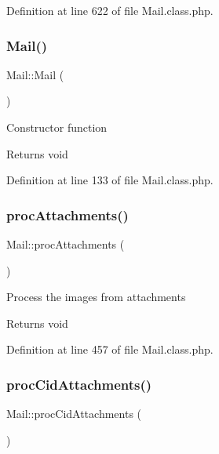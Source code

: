 Definition at line 622 of file Mail.\+class.\+php.

\hypertarget{classMail_acd3d916cd6a769cdaf6e91dbc2c85699}{}\label{classMail_acd3d916cd6a769cdaf6e91dbc2c85699} 
\subsubsection{\texorpdfstring{Mail()}{Mail()}}
{\footnotesize\ttfamily Mail\+::\+Mail (\begin{DoxyParamCaption}{ }\end{DoxyParamCaption})}

Constructor function

\begin{DoxyReturn}{Returns}
void 
\end{DoxyReturn}


Definition at line 133 of file Mail.\+class.\+php.

\hypertarget{classMail_a136e94d3b4ae6cea8944cf05f58754ce}{}\label{classMail_a136e94d3b4ae6cea8944cf05f58754ce} 
\subsubsection{\texorpdfstring{proc\+Attachments()}{procAttachments()}}
{\footnotesize\ttfamily Mail\+::proc\+Attachments (\begin{DoxyParamCaption}{ }\end{DoxyParamCaption})}

Process the images from attachments

\begin{DoxyReturn}{Returns}
void 
\end{DoxyReturn}


Definition at line 457 of file Mail.\+class.\+php.

\hypertarget{classMail_a185f66ac96139a53251ede273a120d13}{}\label{classMail_a185f66ac96139a53251ede273a120d13} 
\subsubsection{\texorpdfstring{proc\+Cid\+Attachments()}{procCidAttachments()}}
{\footnotesize\ttfamily Mail\+::proc\+Cid\+Attachments (\begin{DoxyParamCaption}{ }\end{DoxyParamCaption})}

